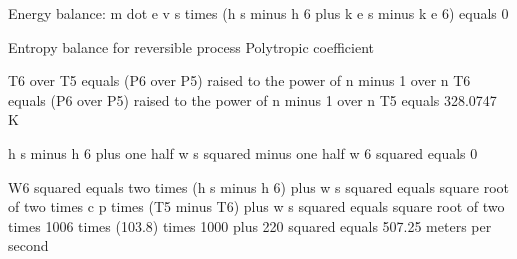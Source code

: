 Energy balance:  
m dot e v s times (h s minus h 6 plus k e s minus k e 6) equals 0

Entropy balance for reversible process  
Polytropic coefficient

T6 over T5 equals (P6 over P5) raised to the power of n minus 1 over n  
T6 equals (P6 over P5) raised to the power of n minus 1 over n  
T5 equals 328.0747 K

h s minus h 6 plus one half w s squared minus one half w 6 squared equals 0

W6 squared equals two times (h s minus h 6) plus w s squared  
equals square root of two times c p times (T5 minus T6) plus w s squared  
equals square root of two times 1006 times (103.8) times 1000 plus 220 squared  
equals 507.25 meters per second